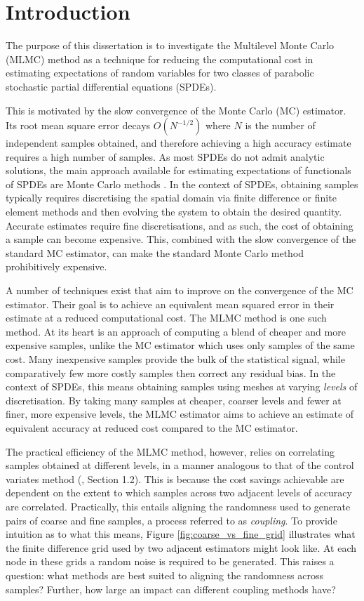 \chapter{Introduction}\label{sec:intro}

The purpose of this dissertation is to investigate the 
Multilevel Monte Carlo (MLMC) method as a technique for reducing 
the computational cost in estimating expectations of random variables 
for two classes of parabolic stochastic partial differential equations (SPDEs).

This is motivated by the slow convergence of the Monte Carlo 
(MC) estimator. Its root mean square error 
decays $O(N^{-1/2})$ where $N$ is the number 
of independent samples obtained, and therefore achieving a high accuracy 
estimate requires a high number of samples. As most SPDEs do not admit 
analytic solutions, the main approach available for estimating expectations of 
functionals of SPDEs are Monte Carlo methods \cite{giles2015multilevel}. In the context
of SPDEs, obtaining samples typically requires discretising 
the spatial domain via finite difference or finite element methods
and then evolving the system to obtain the desired quantity. Accurate 
estimates require fine discretisations, and as such, the cost of obtaining 
a sample can become expensive. This, combined with the slow convergence of the 
standard MC estimator, can make the standard Monte Carlo method prohibitively
expensive.

A number of techniques exist that aim to improve on the convergence of 
the MC estimator. Their goal is to achieve an equivalent mean squared error
in their estimate at a reduced computational cost. The MLMC method is one 
such method. At its heart is an approach of computing a blend of cheaper 
and more expensive samples, unlike the MC estimator which uses only samples 
of the same cost. Many inexpensive samples provide the bulk of the statistical signal, 
while comparatively few more costly samples then correct any residual bias.
In the context of SPDEs, this means obtaining samples using meshes at 
varying \textit{levels} of discretisation. By taking many samples at cheaper,
coarser levels and fewer at finer, more expensive levels, the MLMC 
estimator aims to achieve an estimate of equivalent accuracy at reduced cost
compared to the MC estimator.

The practical efficiency of the MLMC method, however, relies on correlating 
samples obtained at different levels, in a manner analogous to that of the 
control variates method (\cite{giles2015multilevel}, Section 1.2). 
This is because the cost savings achievable are dependent on the extent to which 
samples across two adjacent levels of accuracy are correlated. Practically, this 
entails aligning the randomness used to generate pairs of coarse and 
fine samples, a process referred to as \textit{coupling}.
To provide intuition as to what this means, Figure
\ref{fig:coarse_vs_fine_grid} illustrates what the finite difference 
grid used by two adjacent estimators might look like. At each 
node in these grids a random noise is required to be generated. 
This raises a question: what methods are best suited to aligning the 
randomness across samples? Further, how large an impact 
can different coupling methods have?


